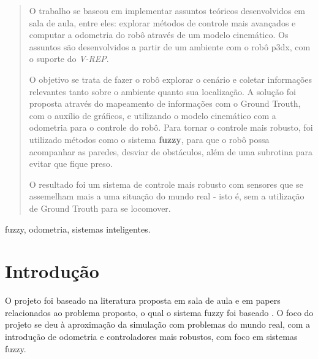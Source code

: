 \documentclass[twoside,conference,a4paper]{IEEEtran}
\begin{document}
\begin{abstract}
O trabalho se baseou em implementar assuntos teóricos desenvolvidos em sala de aula,
entre eles: explorar métodos de controle mais avançados e computar a odometria
do robô através de um modelo cinemático. Os assuntos são desenvolvidos a partir de
um ambiente com o robô p3dx, com o suporte do \textit{V-REP}.

O objetivo se trata de fazer o robô explorar o cenário e coletar informações relevantes tanto sobre o ambiente quanto sua localização. A solução foi proposta através do mapeamento de informações com o Ground Trouth, com o auxílio de gráficos, e utilizando o modelo cinemático com a odometria para o controle do robô. Para tornar o controle mais robusto, foi utilizado métodos como o sistema \textbf{fuzzy}, para que o robô possa acompanhar as paredes, desviar de obstáculos, além de uma subrotina para evitar que fique preso.

O resultado foi um sistema de controle mais robusto com sensores que se assemelham mais a uma situação do mundo real - isto é, sem a utilização de Ground Trouth para se locomover.


\end{abstract}

\begin{IEEEkeywords}
fuzzy, odometria, sistemas inteligentes.


\end{IEEEkeywords}


\section{Introdução}
O projeto foi baseado na literatura proposta em sala de aula e em papers relacionados ao problema proposto, o qual o sistema fuzzy foi baseado \cite{Reinhard:1995}. O foco do projeto se deu à aproximação da simulação com problemas do mundo real, com a introdução de odometria e controladores mais robustos, com foco em sistemas fuzzy.
\end{document}
